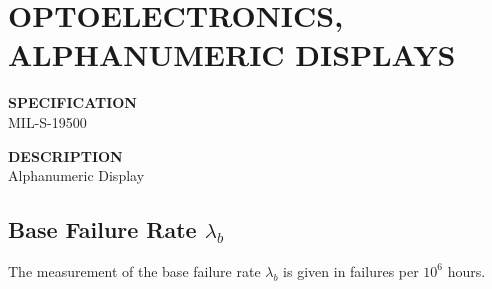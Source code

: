 \section{OPTOELECTRONICS, ALPHANUMERIC DISPLAYS}

\begin{minipage}[t]{0.29\textwidth}
    \textbf{SPECIFICATION}\\
    MIL-S-19500
\end{minipage}
\begin{minipage}[t]{0.7\textwidth}
    \textbf{DESCRIPTION}\\
    {\fontsize{12pt}{12pt}\selectfont Alphanumeric Display}
\end{minipage}

\subsection{Base Failure Rate $\lambda_b$}
The measurement of the base failure rate $\lambda_b$ is given in failures per $10^6$ hours.
